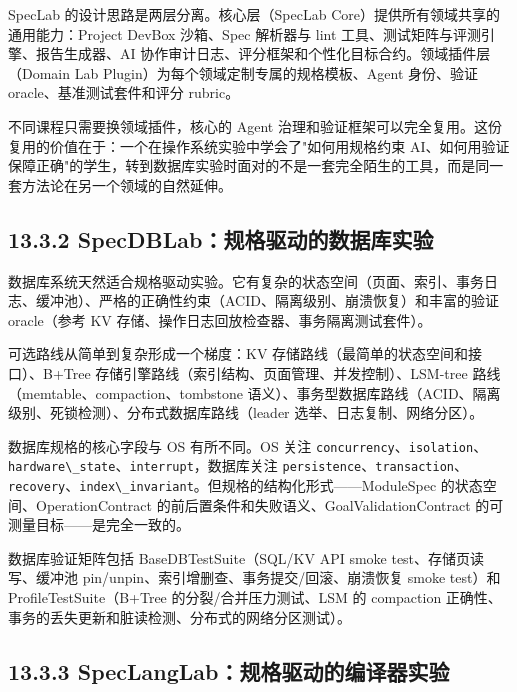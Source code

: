\documentclass[UTF8,a4paper,12pt,openany]{ctexrep}
\newcommand{\passthrough}[1]{#1}
\begin{document}
SpecLab 的设计思路是两层分离。核心层（SpecLab Core）提供所有领域共享的通用能力：Project DevBox 沙箱、Spec 解析器与 lint 工具、测试矩阵与评测引擎、报告生成器、AI 协作审计日志、评分框架和个性化目标合约。领域插件层（Domain Lab Plugin）为每个领域定制专属的规格模板、Agent 身份、验证 oracle、基准测试套件和评分 rubric。

不同课程只需要换领域插件，核心的 Agent 治理和验证框架可以完全复用。这份复用的价值在于：一个在操作系统实验中学会了"如何用规格约束 AI、如何用验证保障正确"的学生，转到数据库实验时面对的不是一套完全陌生的工具，而是同一套方法论在另一个领域的自然延伸。

\subsection{13.3.2 SpecDBLab：规格驱动的数据库实验}\label{1332-specdblabux89c4ux683cux9a71ux52a8ux7684ux6570ux636eux5e93ux5b9eux9a8c}

数据库系统天然适合规格驱动实验。它有复杂的状态空间（页面、索引、事务日志、缓冲池）、严格的正确性约束（ACID、隔离级别、崩溃恢复）和丰富的验证 oracle（参考 KV 存储、操作日志回放检查器、事务隔离测试套件）。

可选路线从简单到复杂形成一个梯度：KV 存储路线（最简单的状态空间和接口）、B+Tree 存储引擎路线（索引结构、页面管理、并发控制）、LSM-tree 路线（memtable、compaction、tombstone 语义）、事务型数据库路线（ACID、隔离级别、死锁检测）、分布式数据库路线（leader 选举、日志复制、网络分区）。

数据库规格的核心字段与 OS 有所不同。OS 关注 \passthrough{\lstinline!concurrency!}、\passthrough{\lstinline!isolation!}、\passthrough{\lstinline!hardware\_state!}、\passthrough{\lstinline!interrupt!}，数据库关注 \passthrough{\lstinline!persistence!}、\passthrough{\lstinline!transaction!}、\passthrough{\lstinline!recovery!}、\passthrough{\lstinline!index\_invariant!}。但规格的结构化形式------ModuleSpec 的状态空间、OperationContract 的前后置条件和失败语义、GoalValidationContract 的可测量目标------是完全一致的。

数据库验证矩阵包括 BaseDBTestSuite（SQL/KV API smoke test、存储页读写、缓冲池 pin/unpin、索引增删查、事务提交/回滚、崩溃恢复 smoke test）和 ProfileTestSuite（B+Tree 的分裂/合并压力测试、LSM 的 compaction 正确性、事务的丢失更新和脏读检测、分布式的网络分区测试）。

\subsection{13.3.3 SpecLangLab：规格驱动的编译器实验}\label{1333-speclanglabux89c4ux683cux9a71ux52a8ux7684ux7f16ux8bd1ux5668ux5b9eux9a8c}
\end{document}
